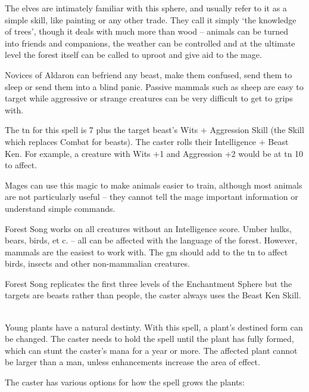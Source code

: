 \begin{multicols}{2}

\noindent
The elves are intimately familiar with this sphere, and usually refer to it as a simple skill, like painting or any other trade. They call it simply `the knowledge of trees', though it deals with much more than wood -- animals can be turned into friends and companions, the weather can be controlled and at the ultimate level the forest itself can be called to uproot and give aid to the mage.

\spelllevel

\label{forestsong}
\noindent
Novices of Aldaron can befriend any beast, make them confused, send them to sleep or send them into a blind panic.
Passive mammals such as sheep are easy to target while aggressive or strange creatures can be very difficult to get to grips with.

The \gls{tn} for this spell is 7 plus the target beast's Wits + Aggression Skill (the Skill which replaces Combat for beasts). The caster rolls their Intelligence + Beast Ken. For example, a creature with Wits +1 and Aggression +2 would be at \gls{tn} 10 to affect.

Mages can use this magic to make animals easier to train, although most animals are not particularly useful -- they cannot tell the mage important information or understand simple commands.

Forest Song works on all creatures without an Intelligence score.
Umber hulks, bears, birds, et c. -- all can be affected with the language of the forest.
However, mammals are the easiest to work with.
The \gls{gm} should add to the \gls{tn} to affect birds, insects and other non-mammalian creatures.

Forest Song replicates the first three levels of the Enchantment Sphere but the targets are beasts rather than people, the caster always uses the Beast Ken Skill.

\\
Young plants have a natural destinty.
With this spell, a plant's destined form can be changed.
The caster needs to hold the spell until the plant has fully formed, which can stunt the caster's mana for a year or more.
The affected plant cannot be larger than a man, unless enhancements increase the area of effect.

The caster has various options for how the spell grows the plants:


\end{multicols}
